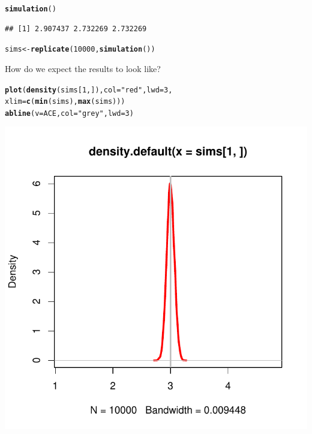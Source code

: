 \documentclass[12 pt]{article}\usepackage[]{graphicx}\usepackage[]{color}
\makeatletter
\def\maxwidth{ %
  \ifdim\Gin@nat@width>\linewidth
    \linewidth
  \else
    \Gin@nat@width
  \fi
}
\newcommand{\hlnum}[1]{\textcolor[rgb]{0.686,0.059,0.569}{#1}}%
\newcommand{\hlstr}[1]{\textcolor[rgb]{0.192,0.494,0.8}{#1}}%
\newcommand{\hlstd}[1]{\textcolor[rgb]{0.345,0.345,0.345}{#1}}%
\newcommand{\hlkwb}[1]{\textcolor[rgb]{0.69,0.353,0.396}{#1}}%
\newcommand{\hlkwc}[1]{\textcolor[rgb]{0.333,0.667,0.333}{#1}}%
\newcommand{\hlkwd}[1]{\textcolor[rgb]{0.737,0.353,0.396}{\textbf{#1}}}%
\newenvironment{kframe}{%
 \def\at@end@of@kframe{}%
 \ifinner\ifhmode%
  \def\at@end@of@kframe{\end{minipage}}%
  \begin{minipage}{\columnwidth}%
 \fi\fi%
 \def\FrameCommand##1{\hskip\@totalleftmargin \hskip-\fboxsep
 \colorbox{shadecolor}{##1}\hskip-\fboxsep
     \hskip-\linewidth \hskip-\@totalleftmargin \hskip\columnwidth}%
 \MakeFramed {\advance\hsize-\width
   \@totalleftmargin\z@ \linewidth\hsize
   \@setminipage}}%
 {\par\unskip\endMakeFramed%
 \at@end@of@kframe}
\newenvironment{knitrout}{}{} %
\makeatother
\begin{document}
\begin{knitrout}
\color{fgcolor}\begin{kframe}
\begin{alltt}
\hlkwd{simulation}\hlstd{()}
\end{alltt}
\begin{verbatim}
## [1] 2.907437 2.732269 2.732269
\end{verbatim}
\begin{alltt}
\hlstd{sims} \hlkwb{<-} \hlkwd{replicate}\hlstd{(}\hlnum{10000}\hlstd{,} \hlkwd{simulation}\hlstd{())}
\end{alltt}
\end{kframe}
\end{knitrout}

How do we expect the results to look like?


\begin{knitrout}
\color{fgcolor}\begin{kframe}
\begin{alltt}
\hlkwd{plot}\hlstd{(}\hlkwd{density}\hlstd{(sims[}\hlnum{1}\hlstd{, ]),} \hlkwc{col} \hlstd{=} \hlstr{"red"}\hlstd{,} \hlkwc{lwd} \hlstd{=} \hlnum{3}\hlstd{,}
    \hlkwc{xlim} \hlstd{=} \hlkwd{c}\hlstd{(}\hlkwd{min}\hlstd{(sims),} \hlkwd{max}\hlstd{(sims)))}
\hlkwd{abline}\hlstd{(}\hlkwc{v} \hlstd{= ACE,} \hlkwc{col} \hlstd{=} \hlstr{"grey"}\hlstd{,} \hlkwc{lwd} \hlstd{=} \hlnum{3}\hlstd{)}
\end{alltt}
\end{kframe}

{\centering \includegraphics[width=\maxwidth]{figure/minimal-unnamed-chunk-19-1} 

}



\end{knitrout}
\end{document}
